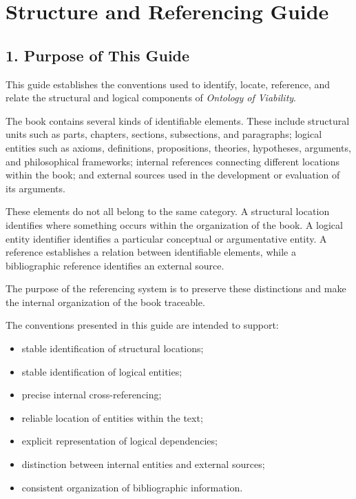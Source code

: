 
\cleardoublepage

\chapter*{Structure and Referencing Guide}

{}


\section*{1. Purpose of This Guide}

This guide establishes the conventions used to identify,
locate, reference, and relate the structural and logical
components of \textit{Ontology of Viability}.

The book contains several kinds of identifiable elements.
These include structural units such as parts, chapters,
sections, subsections, and paragraphs; logical entities
such as axioms, definitions, propositions, theories,
hypotheses, arguments, and philosophical frameworks;
internal references connecting different locations within
the book; and external sources used in the development
or evaluation of its arguments.

These elements do not all belong to the same category.
A structural location identifies where something occurs
within the organization of the book. A logical entity
identifier identifies a particular conceptual or
argumentative entity. A reference establishes a relation
between identifiable elements, while a bibliographic
reference identifies an external source.

The purpose of the referencing system is to preserve
these distinctions and make the internal organization
of the book traceable.

The conventions presented in this guide are intended
to support:

\begin{itemize}
    \item stable identification of structural locations;
    \item stable identification of logical entities;
    \item precise internal cross-referencing;
    \item reliable location of entities within the text;
    \item explicit representation of logical dependencies;
    \item distinction between internal entities and
    external sources;
    \item consistent organization of bibliographic
    information.
\end{itemize}

